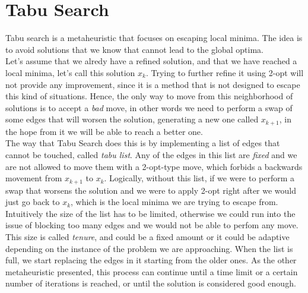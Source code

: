 \section{Tabu Search}
Tabu search is a metaheuristic that focuses on escaping local minima. The idea is to avoid solutions that we know that cannot lead
to the global optima.\\
Let's assume that we alredy have a refined solution, and that we have reached a local minima, let's call this solution $x_k$. 
Trying to further refine it using 2-opt will not provide any improvement, since it is a method that is not designed to escape this
kind of situations. Hence, the only way to move from this neighborhood of solutions is to accept a \textit{bad} move, in other words
we need to perform a swap of some edges that will worsen the solution, generating a new one called $x_{k+1}$, in the hope from it we will be 
able to reach a better one.\\
The way that Tabu Search does this is by implementing a list of edges that cannot be touched, called \textit{tabu list}. Any of the
edges in this list are \textit{fixed} and we are not allowed to move them with a 2-opt-type move, which forbids a backwards movement
from $x_{k+1}$ to $x_k$. Logically, without this list, if we were to perform a swap that worsens the solution and we were to 
apply 2-opt right after we would just go back to $x_k$, which is the local minima we are trying to escape from.\\
Intuitively the size of the list has to be limited, otherwise we could run into the issue of blocking too many edges and we would not
be able to perfom any move. This size is called \textit{tenure}, and could be a fixed amount or it could be adaptive depending on the
instance of the problem we are approaching. When the list is full, we start replacing the edges in it starting from the older ones.
As the other metaheuristic presented, this process can continue until a time limit or a certain number of iterations is reached, or
until the solution is considered good enough.

